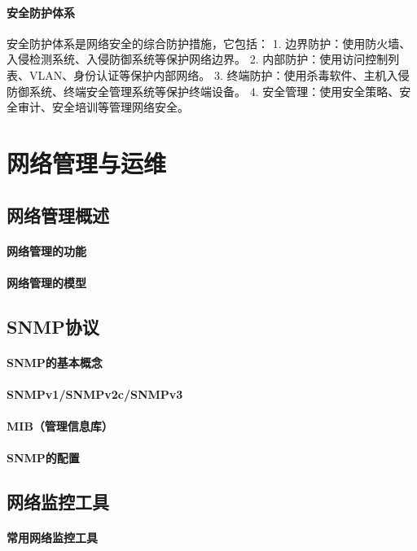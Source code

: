 \documentclass{book}
\begin{document}
\subsubsection{安全防护体系}
安全防护体系是网络安全的综合防护措施，它包括：
1. 边界防护：使用防火墙、入侵检测系统、入侵防御系统等保护网络边界。
2. 内部防护：使用访问控制列表、VLAN、身份认证等保护内部网络。
3. 终端防护：使用杀毒软件、主机入侵防御系统、终端安全管理系统等保护终端设备。
4. 安全管理：使用安全策略、安全审计、安全培训等管理网络安全。

\chapter{网络管理与运维}
\section{网络管理概述}
\subsubsection{网络管理的功能}
\subsubsection{网络管理的模型}
\section{SNMP协议}
\subsubsection{SNMP的基本概念}
\subsubsection{SNMPv1/SNMPv2c/SNMPv3}
\subsubsection{MIB（管理信息库）}
\subsubsection{SNMP的配置}
\section{网络监控工具}
\subsubsection{常用网络监控工具}
\end{document}
